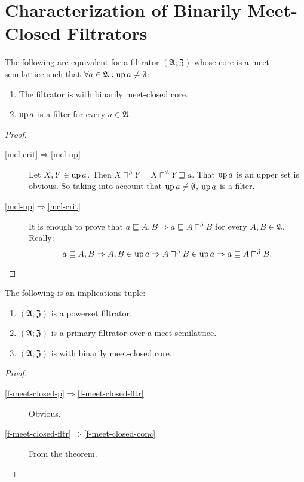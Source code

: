 \section{Characterization of Binarily Meet-Closed Filtrators}
\begin{thm}
\label{up-filt-crit}The following are equivalent for a filtrator
$(\mathfrak{A};\mathfrak{Z})$ whose core is a meet semilattice such
that $\forall a\in\mathfrak{A}:\operatorname{up} a\ne\emptyset$:
\begin{enumerate}
\item \label{mcl-crit}The filtrator is with binarily meet-closed core.
\item \label{mcl-up}$\operatorname{up} a$ is a filter for every $a\in\mathfrak{A}$.
\end{enumerate}
\end{thm}
\begin{proof}
~
\begin{description}
\item [{\ref{mcl-crit}$\Rightarrow$\ref{mcl-up}}] Let $X,Y\in\operatorname{up} a$.
Then $X\sqcap^{\mathfrak{Z}}Y=X\sqcap^{\mathfrak{A}}Y\sqsupseteq a$.
That $\operatorname{up} a$ is an upper set is obvious. So taking into account that
$\operatorname{up} a\ne\emptyset$, $\operatorname{up} a$ is a filter.
\item [{\ref{mcl-up}$\Rightarrow$\ref{mcl-crit}}] It is enough to prove
that $a\sqsubseteq A,B\Rightarrow a\sqsubseteq A\sqcap^{\mathfrak{Z}}B$
for every $A,B\in\mathfrak{A}$. Really:
\[
a\sqsubseteq A,B\Rightarrow A,B\in\operatorname{up} a\Rightarrow A\sqcap^{\mathfrak{Z}}B\in\operatorname{up} a\Rightarrow a\sqsubseteq A\sqcap^{\mathfrak{Z}}B.
\]

\end{description}
\end{proof}
\begin{cor}
\label{f-meet-closed}The following is an implications tuple:
\begin{enumerate}
\item \label{f-meet-closed-p}$(\mathfrak{A};\mathfrak{Z})$ is a powerset
filtrator.
\item \label{f-meet-closed-fltr}$(\mathfrak{A};\mathfrak{Z})$ is a primary
filtrator over a meet semilattice.
\item \label{f-meet-closed-conc}$(\mathfrak{A};\mathfrak{Z})$ is with
binarily meet-closed core.
\end{enumerate}
\end{cor}
\begin{proof}
~
\begin{description}
\item [{\ref{f-meet-closed-p}$\Rightarrow$\ref{f-meet-closed-fltr}}] Obvious.
\item [{\ref{f-meet-closed-fltr}$\Rightarrow$\ref{f-meet-closed-conc}}] From
the theorem.
\end{description}
\end{proof}


